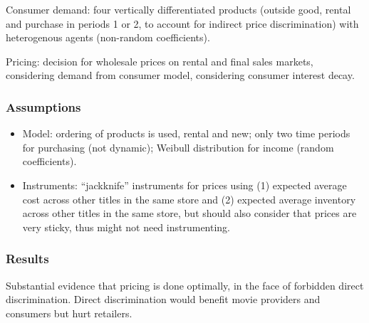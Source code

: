 Consumer demand: four vertically differentiated products (outside good, rental and purchase in periods 1 or 2, to account for indirect price discrimination) with heterogenous agents (non-random coefficients).

Pricing: decision for wholesale prices on rental and final sales markets, considering demand from consumer model, considering consumer interest decay.

\subsubsection{Assumptions}

\begin{itemize}
\item Model: ordering of products is used, rental and new; only two time periods for purchasing (not dynamic); Weibull distribution for income (random coefficients).
\item Instruments: ``jackknife'' instruments for prices using (1) expected average cost across other titles in the same store and (2) expected average inventory across other titles in the same store, but should also consider that prices are very sticky, thus might not need instrumenting.
\end{itemize}

\subsubsection{Results}

Substantial evidence that pricing is done optimally, in the face of forbidden direct discrimination. Direct discrimination would benefit movie providers and consumers but hurt retailers. 